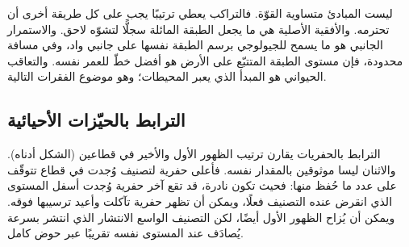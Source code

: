 ليست المبادئ متساوية القوّة. فالتراكب يعطي ترتيبًا يجب على كل طريقة أخرى أن تحترمه. والأفقية الأصلية هي ما يجعل الطبقة المائلة سجلًّا لتشوّه لاحق. والاستمرار الجانبي هو ما يسمح للجيولوجي برسم الطبقة نفسها على جانبي واد، وفي مسافة محدودة، فإن مستوى الطبقة المتتبّع على الأرض هو أفضل خطّ للعمر نفسه. والتعاقب الحيواني هو المبدأ الذي يعبر المحيطات؛ وهو موضوع الفقرات التالية.

\subsection*{الترابط بالحيّزات الأحيائية}

الترابط بالحفريات يقارن ترتيب الظهور الأول والأخير في قطاعين (الشكل أدناه). والاثنان ليسا موثوقين بالمقدار نفسه. فأعلى حفرية لتصنيف وُجدت في قطاع تتوقّف على عدد ما حُفظ منها: فحيث تكون نادرة، قد تقع آخر حفرية وُجدت أسفل المستوى الذي انقرض عنده التصنيف فعلًا، ويمكن أن تظهر حفرية تآكلت وأعيد ترسيبها فوقه. ويمكن أن يُزاح الظهور الأول أيضًا، لكن التصنيف الواسع الانتشار الذي انتشر بسرعة يُصادَف عند المستوى نفسه تقريبًا عبر حوض كامل.

